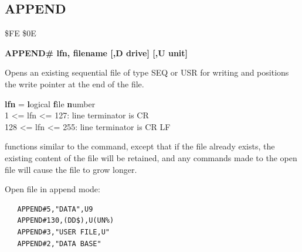 \newpage
\subsection{APPEND}
\begin{description}[leftmargin=2cm,style=nextline]
\item [Token:] \$FE \$0E
\item [Format:]
  {\bf APPEND\# lfn, filename [,D drive] [,U unit] }
\item [Usage:]
   Opens an existing sequential file of type
   SEQ or USR for writing and positions the write pointer
   at the end of the file.

   {\bf lfn} = {\bf l}ogical {\bf f}ile {\bf n}umber \\
   1 <= lfn <= 127: line terminator is CR \\
   128 <= lfn <= 255: line terminator is CR LF

   \filenamedefinition

   \drivedefinition

   \unitdefinition

\item [Remarks:]
    functions similar to the 
   command, except that if the file already
   exists, the existing content of the file will be retained, and any
    commands made to the
   open file will cause the file to grow longer.

\item [Example:] Open file in append mode:

\begin{tcolorbox}[colback=black,coltext=white]
\verbatimfont{\codefont}
\begin{verbatim}
   APPEND#5,"DATA",U9
   APPEND#130,(DD$),U(UN%)
   APPEND#3,"USER FILE,U"
   APPEND#2,"DATA BASE"
\end{verbatim}
\end{tcolorbox}
\end{description}


\newpage
